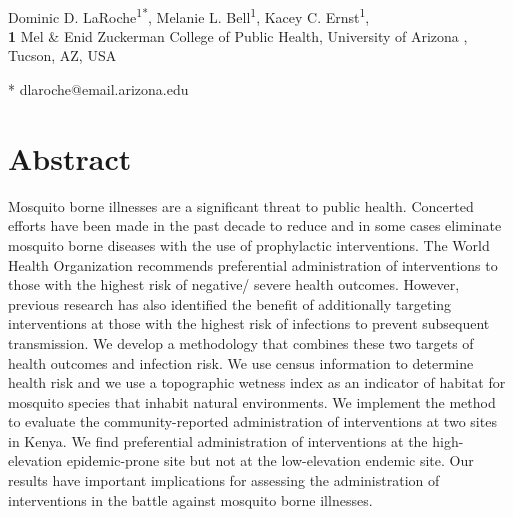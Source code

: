 \documentclass[10pt,letterpaper]{article}\usepackage[]{graphicx}\usepackage[]{color}
\date{}
\begin{document}
\vspace*{0.2in}
\begin{flushleft}
{\Large
\textbf{} %
}
\newline
\\
Dominic D. LaRoche\textsuperscript{1*},
Melanie L. Bell\textsuperscript{1},
Kacey C. Ernst\textsuperscript{1},
\\
\bigskip
\textbf{1} Mel \& Enid Zuckerman College of Public Health, University of Arizona , Tucson, AZ, USA
\\
\bigskip

* dlaroche@email.arizona.edu

\end{flushleft}






\section*{Abstract}
Mosquito borne illnesses are a significant threat to public health. Concerted efforts have been made in the past decade to reduce and in some cases eliminate mosquito borne diseases with the use of prophylactic interventions. The World Health Organization recommends preferential administration of interventions to those with the highest risk of negative/ severe health outcomes. However,  previous research has also identified the benefit of additionally targeting interventions at those with the highest risk of infections to prevent subsequent transmission. We develop a methodology that combines these two targets of health outcomes and infection risk. We use census information to determine health risk and we use a topographic wetness index as an indicator of habitat for mosquito species that inhabit natural environments.  We implement the method to evaluate the community-reported administration of interventions at two sites in Kenya. We find preferential administration of interventions at the high-elevation epidemic-prone site but not at the low-elevation endemic site. Our results have important implications for assessing the administration of interventions in the battle against mosquito borne illnesses.
\end{document}
